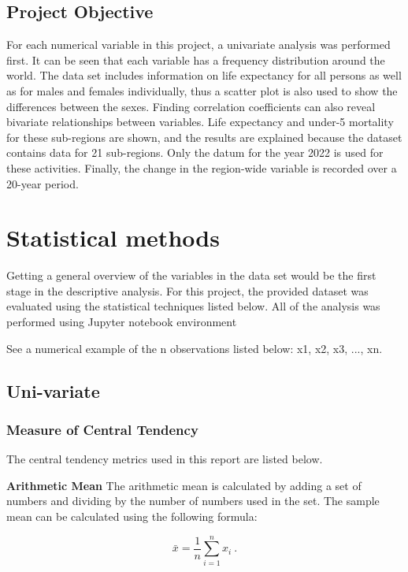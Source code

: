 \documentclass[12 pt]{scrartcl}
\begin{document}
\subsection{Project Objective}

For each numerical variable in this project, a univariate analysis was performed first. It can be seen that each variable has a frequency distribution around the world. The data set includes information on life expectancy for all persons as well as for males and females individually, thus a scatter plot is also used to show the differences between the sexes. Finding correlation coefficients can also reveal bivariate relationships between variables. Life expectancy and under-5 mortality for these sub-regions are shown, and the results are explained because the dataset contains data for 21 sub-regions. Only the datum for the year 2022 is used for these activities. Finally, the change in the region-wide variable is recorded over a 20-year period.

\section{Statistical methods}

Getting a general overview of the variables in the data set would be the first stage in the descriptive analysis. For this project, the provided dataset was evaluated using the statistical techniques listed below. All of the analysis was performed using Jupyter notebook environment
\citep{Python}

See a numerical example of the n observations listed below: x1, x2, x3, ..., xn.

\subsection{Uni-variate}

\subsubsection{Measure of Central Tendency}

The central tendency metrics used in this report are listed below.

 \textbf{Arithmetic Mean} The arithmetic mean is calculated by adding a set of numbers and dividing by the number of numbers used in the set. The sample mean can be calculated using the following formula:

\[ \bar{x} = \frac{1}{n}{\sum_{i=1}^n x_i} \: .\]
\end{document}
